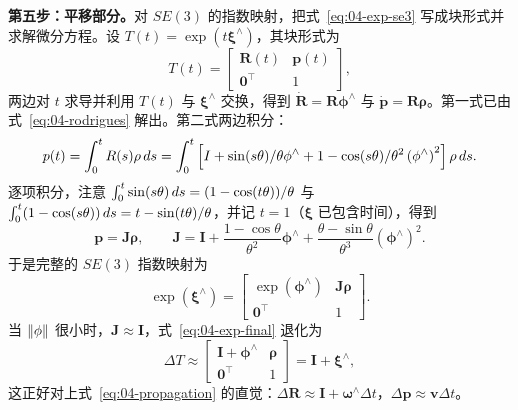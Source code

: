 \textbf{第五步：平移部分。}对 $SE(3)$ 的指数映射，把式~\eqref{eq:04-exp-se3} 写成块形式并求解微分方程。设 $T(t)=\exp(t\bm{\xi}^{\wedge})$，其块形式为
\begin{equation}
  T(t) = \begin{bmatrix}\bm{R}(t) & \bm{p}(t)\\ \bm{0}^{\top} & 1\end{bmatrix},
\end{equation}
两边对 $t$ 求导并利用 $T(t)$ 与 $\bm{\xi}^{\wedge}$ 交换，得到 $\dot{\bm{R}}=\bm{R}\bm{\phi}^{\wedge}$ 与 $\dot{\bm{p}}=\bm{R}\bm{\rho}$。第一式已由式~\eqref{eq:04-rodrigues} 解出。第二式两边积分：
\begin{equation}
  p(t) = \int_{0}^{t}R(s)\rho\,d s
  = \int_{0}^{t}\left[I + \sin(s\theta)/\theta\phi^{\wedge}
  + 1-\cos(s\theta)/\theta^{2}\left(\phi^{\wedge}\right)^{2}\right]\rho\,d s.
\end{equation}
逐项积分，注意 $\int_0^t\sin(s\theta)\,d s=(1-\cos(t\theta))/\theta$ 与 $\int_0^t(1-\cos(s\theta))\,d s=t-\sin(t\theta)/\theta$，并记 $t=1$（$\bm{\xi}$ 已包含时间），得到
\begin{equation}
  \bm{p} = \bm{J}\bm{\rho},\qquad
  \bm{J} = \bm{I} + \frac{1-\cos\theta}{\theta^{2}}\bm{\phi}^{\wedge}
  + \frac{\theta-\sin\theta}{\theta^{3}}\left(\bm{\phi}^{\wedge}\right)^{2}.
  \label{eq:04-J}
\end{equation}
于是完整的 $SE(3)$ 指数映射为
\begin{equation}
  \exp\left(\bm{\xi}^{\wedge}\right)
  = \begin{bmatrix}\exp\left(\bm{\phi}^{\wedge}\right) & \bm{J}\bm{\rho}\\ \bm{0}^{\top} & 1\end{bmatrix}.
  \label{eq:04-exp-final}
\end{equation}
当 $\left\lVert \phi \right\rVert$ 很小时，$\bm{J}\approx\bm{I}$，式~\eqref{eq:04-exp-final} 退化为
\begin{equation}
  \Delta T \approx \begin{bmatrix}\bm{I}+\bm{\phi}^{\wedge} & \bm{\rho}\\ \bm{0}^{\top} & 1\end{bmatrix}
  = \bm{I} + \bm{\xi}^{\wedge},
  \label{eq:04-exp-small}
\end{equation}
这正好对上式~\eqref{eq:04-propagation} 的直觉：$\Delta\bm{R}\approx\bm{I}+\bm{\omega}^{\wedge}\Delta t$，$\Delta\bm{p}\approx\bm{v}\Delta t$。

